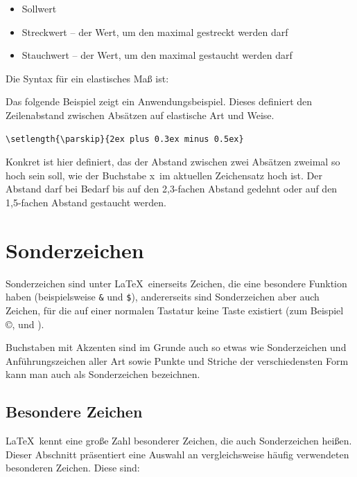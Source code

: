 \begin{itemize}
\item Sollwert 
\item Streckwert -- der Wert, um den maximal gestreckt werden darf
\item Stauchwert -- der Wert, um den maximal gestaucht werden darf
\end{itemize}

Die Syntax für ein elastisches Maß ist:



Das folgende Beispiel zeigt ein Anwendungsbeispiel. Dieses definiert den Zeilenabstand zwischen Absätzen auf elastische Art und Weise.

\begin{Verbatim}[frame=single]
\setlength{\parskip}{2ex plus 0.3ex minus 0.5ex}
\end{Verbatim}

Konkret ist hier definiert, das der Abstand zwischen zwei 
Absätzen zweimal so hoch sein soll, wie der Buchstabe \glqq x\grqq\ im aktuellen Zeichensatz hoch ist. Der Abstand darf bei Bedarf bis auf den 2,3-fachen Abstand gedehnt oder auf den 1,5-fachen Abstand gestaucht werden.


\section{Sonderzeichen}

Sonderzeichen sind unter \LaTeX\ einerseits
Zeichen, die eine besondere Funktion haben (beispielsweise \verb!&! und
\verb!$!), andererseits sind Sonderzeichen aber auch Zeichen, für die auf 
einer normalen Tastatur keine Taste existiert (zum Beispiel
\copyright, \dag und \ddag).

Buchstaben mit Akzenten sind im Grunde auch so etwas wie 
Sonderzeichen und Anführungszeichen 
aller Art sowie Punkte und Striche
der verschiedensten Form kann man auch als Sonderzeichen bezeichnen.


\subsection{Besondere Zeichen}

\LaTeX\ kennt eine große Zahl besonderer Zeichen, die auch Sonderzeichen heißen. Dieser Abschnitt präsentiert eine Auswahl an vergleichsweise häufig verwendeten besonderen Zeichen. Diese sind:


